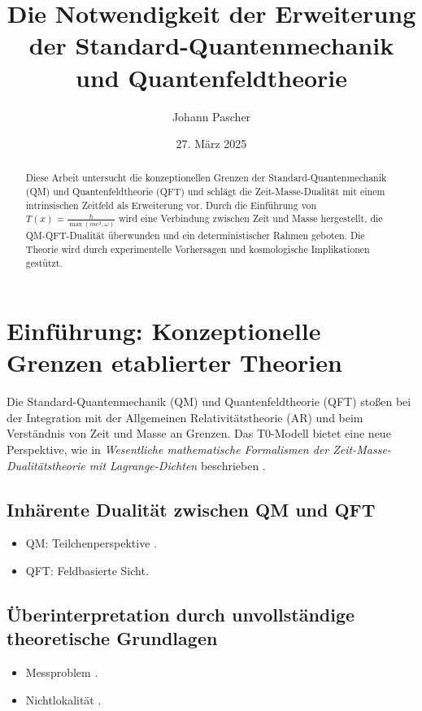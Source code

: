 \documentclass{article}
\title{Die Notwendigkeit der Erweiterung der Standard-Quantenmechanik und Quantenfeldtheorie}
\author{Johann Pascher}
\date{27. März 2025}
\newcommand{\Tfield}{T(x)}
\begin{document}
	
	\maketitle
	
	\begin{abstract}
		Diese Arbeit untersucht die konzeptionellen Grenzen der Standard-Quantenmechanik (QM) und Quantenfeldtheorie (QFT) und schlägt die Zeit-Masse-Dualität mit einem intrinsischen Zeitfeld als Erweiterung vor. Durch die Einführung von \(\Tfield = \frac{\hbar}{\max(m c^2, \omega)}\) wird eine Verbindung zwischen Zeit und Masse hergestellt, die QM-QFT-Dualität überwunden und ein deterministischer Rahmen geboten. Die Theorie wird durch experimentelle Vorhersagen und kosmologische Implikationen gestützt.
	\end{abstract}
	
	\tableofcontents
	\newpage
	
	\section{Einführung: Konzeptionelle Grenzen etablierter Theorien}
	Die Standard-Quantenmechanik (QM) und Quantenfeldtheorie (QFT) stoßen bei der Integration mit der Allgemeinen Relativitätstheorie (AR) und beim Verständnis von Zeit und Masse an Grenzen. Das T0-Modell bietet eine neue Perspektive, wie in \textit{Wesentliche mathematische Formalismen der Zeit-Masse-Dualitätstheorie mit Lagrange-Dichten} beschrieben \cite{wesentlicheFormalismen}.
	
	\subsection{Inhärente Dualität zwischen QM und QFT}
	\begin{itemize}
		\item QM: Teilchenperspektive \cite{schrodinger}.
		\item QFT: Feldbasierte Sicht.
	\end{itemize}
	
	\subsection{Überinterpretation durch unvollständige theoretische Grundlagen}
	\begin{itemize}
		\item Messproblem \cite{einstein2}.
		\item Nichtlokalität \cite{bell}.
	\end{itemize}
	
\end{document}
